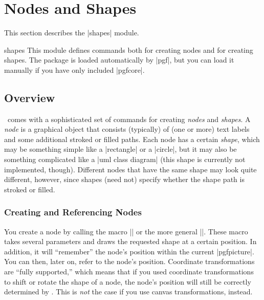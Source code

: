 %
%
%


\section{Nodes and Shapes}

\label{section-shapes}

This section describes the |shapes| module.

\begin{pgfmodule}{shapes}
  This module defines commands both for creating nodes and for
  creating shapes. The package is loaded automatically by |pgf|, but
  you can load it manually if you have  only included |pgfcore|.
\end{pgfmodule}


\subsection{Overview}

\pgfname\ comes with a sophisticated set of commands for creating
\emph{nodes} and \emph{shapes}. A \emph{node} is a graphical object
that consists (typically) of (one or more) text labels and some
additional stroked or filled paths. Each node has a certain
\emph{shape}, which may be something simple like a |rectangle| or a
|circle|, but it may also be something complicated like a
|uml class diagram| (this shape is currently not implemented,
though). Different nodes that have the same shape may look quite
different, however, since shapes (need not) specify whether the shape
path is stroked or filled.


\subsubsection{Creating and Referencing Nodes}

You create a node by calling the macro |\pgfnode| or the more general
|\pgfmultipartnode|. These macro takes several parameters and draws
the requested shape at a certain position. In addition, it will
``remember'' the node's position within the current
|{pgfpicture}|. You can then, later on, refer to the
node's position. Coordinate transformations are ``fully supported,''
which means that if you used coordinate transformations to shift or
rotate the shape of a node, the node's position will still be correctly
determined by \pgfname. This is \emph{not} the case if you use canvas
transformations, instead.


